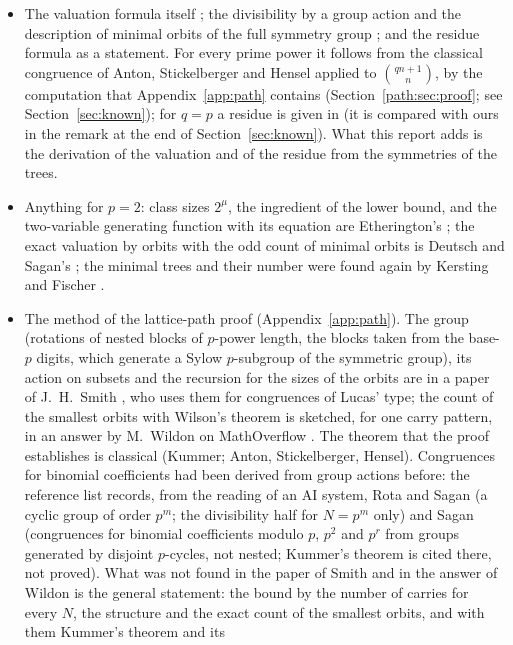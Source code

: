 \documentclass[11pt]{article}
\theoremstyle{definition}
\theoremstyle{remark}
\numberwithin{equation}{section}
\numberwithin{figure}{section}
\begin{document}
\begin{itemize}[itemsep=1pt]
\item The valuation formula itself \cite[Proposition~2]{Konvalinka}; the divisibility by a group action and
 the description of minimal orbits of the full symmetry group \cite[Proposition~7, Lemmas~8--10]{Konvalinka};
 and the residue formula as a statement. For every prime power it follows from the classical congruence of
 Anton, Stickelberger and Hensel applied to $\binom{qn+1}{n}$, by the computation that
 Appendix~\ref{app:path} contains (Section~\ref{path:sec:proof}; see Section~\ref{sec:known}); for $q=p$ a
 residue is given in \cite[Remark~3]{Konvalinka} (it is compared with ours in the remark at the end of
 Section~\ref{sec:known}). What this report adds is the derivation of the valuation and of the residue from
 the symmetries of the trees.
\item Anything for $p=2$: class sizes $2^\mu$, the ingredient of the lower bound, and the two-variable
 generating function with its equation are Etherington's \cite{Etherington}; the exact valuation by orbits
 with the odd count of minimal orbits is Deutsch and Sagan's \cite{DeutschSagan}; the minimal trees and their
 number were found again by Kersting and Fischer \cite{KerstingFischer}.
\item The method of the lattice-path proof (Appendix~\ref{app:path}). The group (rotations of nested blocks
 of $p$-power length, the blocks taken from the base-$p$ digits, which generate a Sylow $p$-subgroup of the
 symmetric group), its action on subsets and the recursion for the sizes of the orbits are in a paper of
 J.~H.~Smith \cite{Smith}, who uses them for congruences of Lucas' type; the count of the smallest orbits
 with Wilson's theorem is sketched, for one carry pattern, in an answer by M.~Wildon on MathOverflow
 \cite{Wildon}. The theorem that the proof establishes is classical (Kummer; Anton, Stickelberger, Hensel).
 Congruences for binomial coefficients had been derived from group actions before: the reference list records,
 from the reading of an AI system, Rota and Sagan \cite{RotaSagan} (a cyclic group of order $p^m$; the
 divisibility half for $N=p^m$ only) and Sagan \cite{SaganAbelian} (congruences for binomial coefficients
 modulo $p$, $p^2$ and $p^r$ from groups generated by disjoint $p$-cycles, not nested; Kummer's theorem is
 cited there, not proved).
 What was not found in the paper of Smith and in the answer of Wildon is the general statement: the bound by the number of carries for
 every $N$, the structure and the exact count of the smallest orbits, and with them Kummer's theorem and its

\end{itemize}
\end{document}
